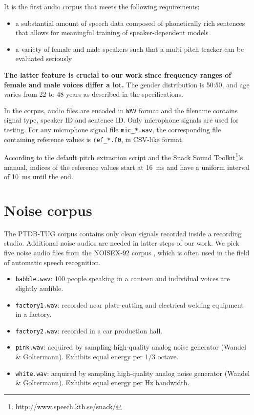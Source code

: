 \documentclass[11pt,a4paper]{report}
\begin{document}
It is the first audio corpus that meets the following requirements:

\begin{itemize}
  \item a substantial amount of speech data composed of phonetically rich sentences that allows for meaningful training of speaker-dependent models
  \item a variety of female and male speakers such that a multi-pitch tracker can be evaluated seriously
\end{itemize}

\textbf{The latter feature is crucial to our work since frequency ranges of female and male voices differ a lot.} The gender distribution is 50:50, and age varies from 22 to 48 years as described in the specifications.

\bigskip

In the corpus, audio files are encoded in \texttt{WAV} format and the filename contains signal type, speaker ID and sentence ID\@.
Only microphone signals are used for testing.
For any microphone signal file \texttt{mic\_*.wav}, the corresponding file containing reference values is \texttt{ref\_*.f0}, in CSV-like format.

According to the default pitch extraction script and the Snack Sound Toolkit\footnote{http://www.speech.kth.se/snack/}'s manual, indices of the reference values start at \SI{16}{\milli\second} and have a uniform interval of \SI{10}{\milli\second} until the end.

\section{Noise corpus}

The PTDB-TUG corpus contains only clean signals recorded inside a recording studio.
Additional noise audios are needed in latter steps of our work.
We pick five noise audio files from the NOISEX-92 corpus \parencite{varga1993assessment}, which is often used in the field of automatic speech recognition.

\begin{itemize}
  \item \texttt{babble.wav}: 100 people speaking in a canteen and individual voices are slightly audible.
  \item \texttt{factory1.wav}: recorded near plate-cutting and electrical welding equipment in a factory.
  \item \texttt{factory2.wav}: recorded in a car production hall.
  \item \texttt{pink.wav}: acquired by sampling high-quality analog noise generator (Wandel \& Goltermann).
    Exhibits equal energy per 1/3 octave.
  \item \texttt{white.wav}: acquired by sampling high-quality analog noise generator (Wandel \& Goltermann).
    Exhibits equal energy per \si{\hertz} bandwidth.
\end{itemize}
\end{document}
